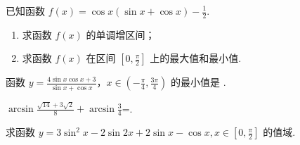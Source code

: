 \documentclass[a4paper , final]{ctexart}
\newenvironment{problem}[1]{%
  \item #1
  \par
  \vspace{8cm}
}{}
\begin{document}
\begin{problems}
\begin{problem}
  {
    已知函数 $f(x) = \cos x(\sin x + \cos x) - \frac{1}{2}$.
    \begin{enumerate}[label=(\arabic*)]
      \item 求函数 $f(x)$ 的单调增区间；
      \item 求函数 $f(x)$ 在区间 $\left[0, \frac{\pi}{2}\right]$ 上的最大值和最小值.
    \end{enumerate}
  }
\end{problem}

\begin{problem}
  {
    函数 $y = \frac{4\sin x\cos x + 3}{\sin x + \cos x}$，$x \in \left(-\frac{\pi}{4}, \frac{3\pi}{4}\right)$ 的最小值是 \underline{\hspace{3cm}}.
  }
\end{problem}

\begin{problem}
  {
    $\arcsin \frac{\sqrt{14}+3\sqrt{2}}{8}+\arcsin\frac{3}{4}$=\underline{\hspace{3cm}}.
  }
\end{problem}

\begin{problem}
  {
    求函数 $y = 3\sin^2 x - 2\sin 2x + 2\sin x - \cos x, x \in \left[0, \frac{\pi}{2}\right]$ 的值域.
  }
\end{problem}
\end{problems}

\newpage
\end{document}
